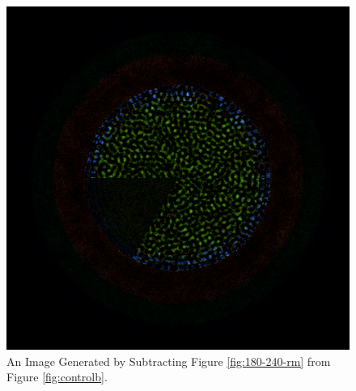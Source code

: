 \begin{figure}[H]
\centering
\includegraphics[width=0.6\linewidth]{figures/180-240/diff-180-240}
\caption{An Image Generated by Subtracting Figure \ref{fig:180-240-rm} from Figure \ref{fig:controlb}.}
\label{fig:180-240-diff}
\end{figure}